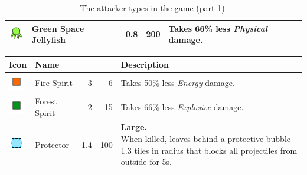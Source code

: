 \begin{table}[H]
\begin{tabular}{m{9mm}m{25mm}D{.}{.}{-1}rm{0.48\textwidth}}
        \includegraphics[height=7mm]{img/Icons/Attackers/Green Jellyfish.png}         & \footnotesize{Green Space Jellyfish}   & 0.8                 & 200              & \footnotesize{Takes 66\% less \emph{Physical} damage.}                                                                                              \\
        \bottomrule
    \end{tabular}
    \caption{The attacker types in the game (part 1).}
    \label{tab:attackers1}
\end{table}

\begin{table}[H]
    \centering
    \begin{tabular}{m{9mm}m{25mm}D{.}{.}{-1}rm{0.48\textwidth}}
        \toprule
        \textbf{Icon}                                                       & \textbf{Name}                &  &  & \textbf{Description}                                                                                                                                        \\
        \midrule
        \includegraphics[height=7mm]{img/Icons/Attackers/Fire Spirit.png}   & \footnotesize{Fire Spirit}   & 3                   & 6                & \footnotesize{Takes 50\% less \emph{Energy} damage.}                                                                                                        \\
        \includegraphics[height=7mm]{img/Icons/Attackers/Forest Spirit.png} & \footnotesize{Forest Spirit} & 2                   & 15               & \footnotesize{Takes 66\% less \emph{Explosive} damage.}                                                                                                     \\
        \includegraphics[height=7mm]{img/Icons/Attackers/Protector.png}     & \footnotesize{Protector}     & 1.4                 & 100              & \footnotesize{\textbf{Large.} \newline When killed, leaves behind a protective bubble 1.3 tiles in radius that blocks all projectiles from outside for 5s.} \\

\end{tabular}
\end{table}
